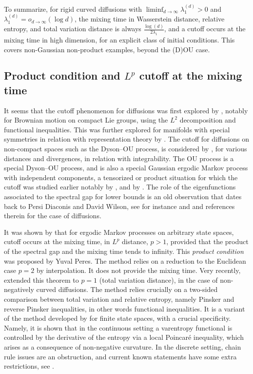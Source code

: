\documentclass[10pt,reqno]{amsart}
\numberwithin{equation}{section}
\begin{document}
To summarize, for rigid curved diffusions with $\liminf_{d\to\infty}\lambda_1^{(d)}>0$ and $\lambda_1^{(d)}=o_{d\to\infty}(\log d)$, the mixing time in Wasserstein distance, relative entropy, and total variation distance is always $\frac{\log(d)}{2\lambda_1}$, and a cutoff occurs at the mixing time in high dimension, for an explicit class of initial conditions. This covers non-Gaussian non-product examples, beyond the (D)OU case.

\subsection{Product condition and \texorpdfstring{$L^p$}{Lp} cutoff at the mixing time}

It seems that the cutoff phenomenon for diffusions was first explored by
\cite{Saloff94}, notably for Brownian motion on compact Lie groups, using the
$L^2$ decomposition and functional inequalities. This was further explored for
manifolds with special symmetries in relation with representation theory by
\cite{Meliot14}. The cutoff for diffusions on non-compact spaces such as the
Dyson--OU process, is considered by \cite{BCL23}, for various distances
and divergences, in relation with integrability. The OU process is a special
Dyson--OU process, and is also a special Gaussian ergodic Markov process
with independent components, a tensorized or product situation for which the
cutoff was studied earlier notably by \cite{MR2203823,MR2260742}, and by
\cite{MR3770869}. The role of the eigenfunctions associated to the spectral
gap for lower bounds is an old observation that dates back to Persi Diaconis
and David Wilson, see for instance \cite{Saloff94} and \cite{BCL23} and
references therein for the case of diffusions.

It was shown by \cite{MR2375599} that for
ergodic Markov processes on arbitrary state spaces, cutoff occurs at the
mixing time, in $L^p$ distance, $p>1$, provided that the product of the
spectral gap and the mixing time tends to infinity. This \emph{product
  condition} was proposed by Yuval Peres. The method relies on a reduction to
the Euclidean case $p=2$ by interpolation. It does not provide the mixing time. Very recently,
\cite{salez-2025} extended this theorem to $p=1$ (total variation distance),
in the case of non-negatively curved diffusions. The method relies crucially
on a two-sided comparison between total variation and relative entropy, namely
Pinsker and reverse Pinsker inequalities, in other words functional
inequalities. It is a variant of the method developed by \cite{Salez24} for
finite state spaces, with a crucial specificity. Namely, it is shown that in
the continuous setting a varentropy functional is controlled by the derivative
of the entropy via a local Poincar\'e inequality, which arises as a
consequence of non-negative curvature. In the discrete setting, chain rule
issues are an obstruction, and current known statements have some extra
restrictions, see \cite{pedrotti-2025}.
\end{document}
